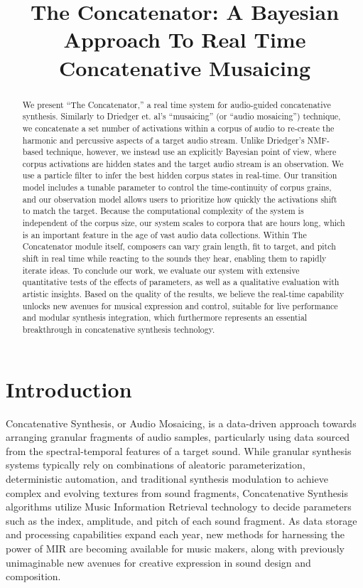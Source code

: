 \documentclass{article}
\title{The Concatenator: A Bayesian Approach To Real Time Concatenative Musaicing}
\begin{document}
%
\maketitle
%

\begin{abstract}
    We present ``The Concatenator,'' a real time system for audio-guided concatenative synthesis. Similarly to Driedger et. al's ``musaicing'' (or ``audio mosaicing'') technique, we concatenate a set number of activations within a corpus of audio to re-create the harmonic and percussive aspects of a target audio stream. Unlike Driedger's NMF-based technique, however, we instead use an explicitly Bayesian point of view, where corpus activations are hidden states and the target audio stream is an observation. We use a particle filter to infer the best hidden corpus states in real-time. Our transition model includes a tunable parameter to control the time-continuity of corpus grains, and our observation model allows users to prioritize how quickly the activations shift to match the target. Because the computational complexity of the system is independent of the corpus size, our system scales to corpora that are hours long, which is an important feature in the age of vast audio data collections. Within The Concatenator module itself, composers can vary grain length, fit to target, and pitch shift in real time while reacting to the sounds they hear, enabling them to rapidly iterate ideas. To conclude our work, we evaluate our system with extensive quantitative tests of the effects of parameters, as well as a qualitative evaluation with artistic insights. Based on the quality of the results, we believe the real-time capability unlocks new avenues for musical expression and control, suitable for live performance and modular synthesis integration, which furthermore represents an essential breakthrough in concatenative synthesis technology.
    
\end{abstract}

\section{Introduction}

Concatenative Synthesis, or Audio Mosaicing, is a data-driven approach towards arranging granular fragments of audio samples, particularly using data sourced from the spectral-temporal features of a target sound. While granular synthesis systems typically rely on combinations of aleatoric parameterization, deterministic automation, and traditional synthesis modulation to achieve complex and evolving textures from sound fragments, Concatenative Synthesis algorithms utilize Music Information Retrieval technology to decide parameters such as the index, amplitude, and pitch of each sound fragment. As data storage and processing capabilities expand each year, new methods for harnessing the power of MIR are becoming available for music makers, along with previously unimaginable new avenues for creative expression in sound design and composition. 
\end{document}
